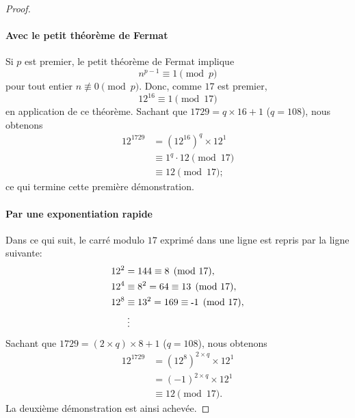 \begin{proof}
\paragraph{Avec le petit théorème de Fermat} Si $p$ est premier, le petit théorème de Fermat implique %
%
\begin{equation}
  n^{p-1} \equiv 1 \pmod{p}
\end{equation}
%
pour tout entier $n \nequiv 0 \pmod{p}$. Donc, comme $17$ est premier, 
%
\begin{equation}
  12^{16} \equiv 1 \pmod{17}
\end{equation}
%
en application de ce théorème. Sachant que $1729 = q \times 16 + 1$ ($q=108$), nous obtenons 
%
\begin{align}
  12^{1729} &= (12^{16})^q \times 12^1 \\
  &\equiv 1^{q} \cdot 12 \pmod{17} \\
  &\equiv 12 \pmod{17}; 
\end{align}
%
ce qui termine cette première démonstration.
%
\paragraph{Par une exponentiation rapide} Dans ce qui suit, le carré modulo $17$ exprimé dans une ligne est repris par la %
ligne suivante:
%
\begin{align}
  12^2 &= 144 \equiv 8 \pmod{17}, \\
  12^4 &\equiv 8^2  = 64 \equiv 13 \pmod{17},  \\
  12^8 &\equiv 13^2 = 169 \equiv \minus 1 \pmod{17}, \\
  &\hspace{0.25em}\vdots\nonumber
\end{align}
%
Sachant que $1729 = (2\times q) \times 8 + 1$ ($q=108$), nous obtenons 
%
\begin{align}
  12^{1729} &= (12^8)^{2\times q}  \times 12^1 \\
  &= (-1)^{2\times q}  \times 12^1 \\
  &\equiv 12 \pmod{17}.
\end{align}
%
La deuxième démonstration est ainsi achevée. 
\end{proof}